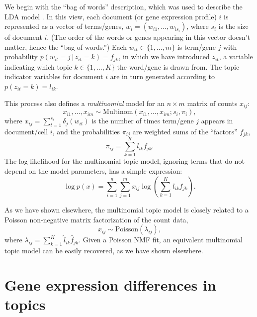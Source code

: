 \documentclass[final]{siamart171218}
\begin{document}
We begin with the ``bag of words'' description, which was used to
describe the LDA model \cite{blei-2003}. In this view, each document
(or gene expression profile) $i$ is represented as a vector of
terms/genes, $w_i = (w_{i1}, \ldots, w_{is_i})$, where $s_i$ is the
size of document $i$. (The order of the words or genes appearing in
this vector doesn't matter, hence the ``bag of words.'') Each $w_{it}
\in \{1, \ldots, m\}$ is term/gene $j$ with probability
$p(w_{it} = j \,|\, z_{it} = k) = f_{jk}$, in which we have introduced
$z_{it}$, a variable indicating which topic $k \in \{1, \ldots, K\}$
the word/gene is drawn from. The topic indicator variables for
document $i$ are in turn generated according to $p(z_{it} = k) =
l_{ik}$.

This process also defines a {\em multinomial} model for an $n \times
m$ matrix of counts $x_{ij}$:
\begin{equation}
x_{i1}, \ldots, x_{im} \sim
\mathrm{Multinom}(x_{i1}, \ldots, x_{im}; s_i, \pi_i),
\end{equation}
where $x_{ij} = \sum_{t=1}^{s_i} \delta_j(w_{it})$ is the number of
times term/gene $j$ appears in document/cell $i$, and the
probabilities $\pi_{ij}$ are weighted sums of the ``factors''
$f_{jk}$,
\begin{equation}
\pi_{ij} = \sum_{k=1}^K l_{ik} f_{jk}.
\end{equation}
The log-likelihood for the multinomial topic model, ignoring terms
that do not depend on the model parameters, has a simple expression:
\begin{equation}
\log p(x) = \sum_{i=1}^n \sum_{j=1}^m
x_{ij} \log({\textstyle \sum_{k=1}^K l_{ik} f_{jk}}).
\end{equation}

As we have shown elsewhere, the multinomial topic model is closely
related to a Poisson non-negative matrix factorization of the count
data,
\begin{equation}
x_{ij} \sim \mathrm{Poisson}(\lambda_{ij}),
\end{equation}
where $\lambda_{ij} = \sum_{k=1}^K \hat{l}_{ik} \hat{f}_{jk}$. Given a
Poisson NMF fit, an equivalent multinomial topic model can be easily
recovered, as we have shown elsewhere.

\section{Gene expression differences in topics}
\end{document}
